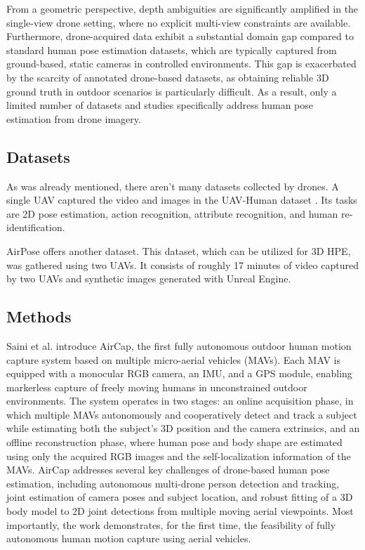 From a geometric perspective, depth ambiguities are significantly amplified in the single-view drone setting, where no explicit multi-view constraints are available. Furthermore, drone-acquired data exhibit a substantial domain gap 
compared to standard human pose estimation datasets, which are typically captured from ground-based, static cameras in controlled environments. This gap is exacerbated by the scarcity of annotated drone-based datasets, as obtaining 
reliable 3D ground truth in outdoor scenarios is particularly difficult. As a result, only a limited number of datasets and studies specifically address human pose estimation from drone imagery.

\subsection{Datasets}
As was already mentioned, there aren't many datasets collected by drones. A single UAV captured the video and images in the UAV-Human dataset \cite{li2021uav}. Its tasks are 2D pose estimation, action recognition, 
attribute recognition, and human re-identification.
\newpage

AirPose \cite{saini2022airpose} offers another dataset. This dataset, which can be utilized for 3D HPE, was gathered using two UAVs. It consists of roughly 17 minutes of video captured by two UAVs and synthetic images generated with Unreal Engine.

\subsection{Methods}
Saini et al. \cite{saini2019markerless} introduce AirCap, the first fully autonomous outdoor human motion capture system based on multiple micro-aerial vehicles (MAVs). Each MAV is equipped with a monocular RGB camera, an IMU, and a GPS module, enabling 
markerless capture of freely moving humans in unconstrained outdoor environments. The system operates in two stages: an online acquisition phase, in which multiple MAVs autonomously and cooperatively detect and track a subject 
while estimating both the subject's 3D position and the camera extrinsics, and an offline reconstruction phase, where human pose and body shape are estimated using only the acquired RGB images and the self-localization information 
of the MAVs. AirCap addresses several key challenges of drone-based human pose estimation, including autonomous multi-drone person detection and tracking, joint estimation of camera poses and subject location, and robust fitting of 
a 3D body model to 2D joint detections from multiple moving aerial viewpoints. Most importantly, the work demonstrates, for the first time, the feasibility of fully autonomous human motion capture using aerial vehicles.

